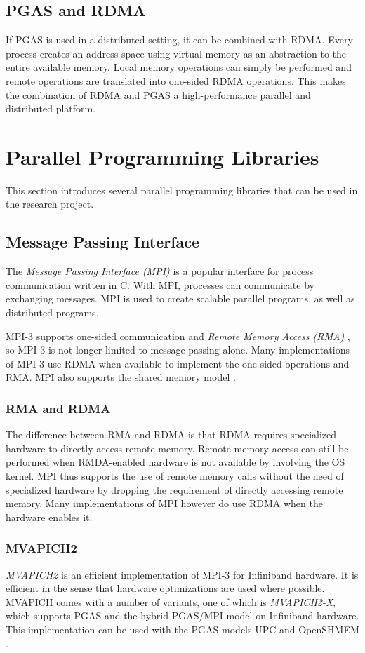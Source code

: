 \subsection{PGAS and RDMA}
If PGAS is used in a distributed setting, it can be combined with RDMA. Every process creates an address space using virtual memory as an abstraction to the entire available memory. Local memory operations can simply be performed and remote operations are translated into one-sided RDMA operations. This makes the combination of RDMA and PGAS a high-performance parallel and distributed platform. 

\section{Parallel Programming Libraries}
This section introduces several parallel programming libraries that can be used in the research project.

\subsection{Message Passing Interface}
The \emph{Message Passing Interface (MPI)} is a popular interface for process communication written in C. With MPI, processes can communicate by exchanging messages. MPI is used to create scalable parallel programs, as well as distributed programs.

MPI-3 supports one-sided communication and \emph{Remote Memory Access (RMA)} \cite{conf/sc/GerstenbergerBH13}, so MPI-3 is not longer limited to message passing alone. Many implementations of MPI-3 use RDMA when available to implement the one-sided operations and RMA. MPI also supports the shared memory model \cite{mpi-shared-mem-win}. 

\subsubsection{RMA and RDMA}
The difference between RMA and RDMA is that RDMA requires specialized hardware to directly access remote memory. Remote memory access can still be performed when RMDA-enabled hardware is not available by involving the OS kernel. MPI thus supports the use of remote memory calls without the need of specialized hardware by dropping the requirement of directly accessing remote memory. Many implementations of MPI however do use RDMA when the hardware enables it.

\subsubsection{MVAPICH2}
\emph{MVAPICH2} \cite{mvapich2} is an efficient implementation of MPI-3 for Infiniband hardware. It is efficient in the sense that hardware optimizations are used where possible. MVAPICH comes with a number of variants, one of which is \emph{MVAPICH2-X}, which supports PGAS and the hybrid PGAS/MPI model on Infiniband hardware. This implementation can be used with the PGAS models UPC \cite{upc} and OpenSHMEM \cite{implementing_openshmem}. 

